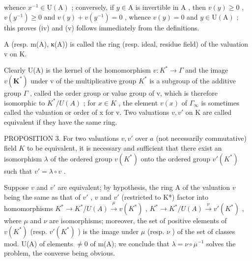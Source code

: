 whence \(x^{-1} \in \mathrm{U}(\mathrm{A})\) ; conversely, if \(y \in \mathrm{A}\) is invertible in \(\mathrm{A}\) , then \(v(y) \geqslant 0\) , \(v(y^{-1}) \geqslant 0\) and \(v(y) + v(y^{-1}) = 0\) , whence \(v(y) = 0\) and \(y \in \mathrm{U}(\mathrm{A})\) ; this proves (iv) and (v) follows immediately from the definitions.

A (resp. m(A), κ(A)) is called the ring (resp. ideal, residue field) of the valuation v on K.

Clearly U(A) is the kernel of the homomorphism \(v: K^{*} \to \Gamma\) and the image \(v(\mathbf{K}^{*})\) under v of the multiplicative group \(K^{*}\) is a subgroup of the additive group \(\Gamma\) , called the order group or value group of v, which is therefore isomorphic to \(K^{*}/U(A)\) ; for \(x \in K\) , the element \(v(x)\) of \(\Gamma_{\infty}\) is sometimes called the valuation or order of x for v. Two valuations \(v, v'\) on K are called equivalent if they have the same ring.

PROPOSITION 3. For two valuations \(v, v'\) over \(a\) (not necessarily commutative) field \(K\) to be equivalent, it is necessary and sufficient that there exist an isomorphism \(\lambda\) of the ordered group \(v(K^*)\) onto the ordered group \(v'(K^*)\) such that \(v' = \lambda \circ v\) .

Suppose \(v\) and \(v'\) are equivalent; by hypothesis, the ring A of the valuation \(v\) being the same as that of \(v'\) , \(v\) and \(v'\) (restricted to K*) factor into homomorphisms \(K^* \to K^*/U(A) \xrightarrow{\mu} v(K^*)\) , \(K^* \to K^*/U(A) \xrightarrow{\nu} v'(K^*)\) , where \(\mu\) and \(\nu\) are isomorphisms; moreover, the set of positive elements of \(v(K^*)\) (resp. \(v'(K^*)\) ) is the image under \(\mu\) (resp. \(\nu\) ) of the set of classes mod. U(A) of elements \(\neq 0\) of m(A); we conclude that \(\lambda = \nu \circ \overline{\mu}^{-1}\) solves the problem, the converse being obvious.

